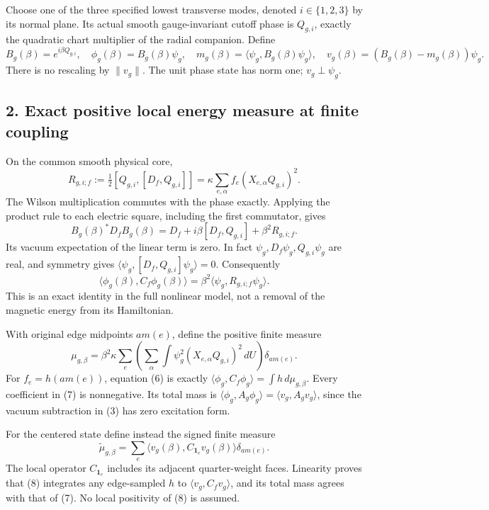 \documentclass[
  11pt,
]{article}
\begin{document}
Choose one of the three specified lowest transverse modes, denoted
\(i\in\{1,2,3\}\) by its normal plane. Its actual smooth gauge-invariant
cutoff phase is \(Q_{g,i}\), exactly the quadratic chart multiplier of
the radial companion. Define \[
 B_g(\beta)=e^{i\beta Q_{g,i}},\quad
 \phi_g(\beta)=B_g(\beta)\psi_g,\quad
 m_g(\beta)=\langle\psi_g,B_g(\beta)\psi_g\rangle,\quad
 v_g(\beta)=(B_g(\beta)-m_g(\beta))\psi_g .
 \tag{3}
\] There is no rescaling by \(\|v_g\|\). The unit phase state has norm
one; \(v_g\perp\psi_g\).

\subsection{2. Exact positive local energy measure at finite
coupling}\label{weak-coupling-part-12-exact-positive-local-energy-measure-at-finite-coupling}

On the common smooth physical core, \[
 R_{g,i;f}:=\tfrac12[Q_{g,i},[D_f,Q_{g,i}]]
           =\kappa\sum_{e,\alpha}f_e(X_{e,\alpha}Q_{g,i})^2 .
 \tag{4}
\] The Wilson multiplication commutes with the phase exactly. Applying
the product rule to each electric square, including the first
commutator, gives \[
 B_g(\beta)^*D_fB_g(\beta)
 =D_f+i\beta[D_f,Q_{g,i}]+\beta^2R_{g,i;f}.
 \tag{5}
\] Its vacuum expectation of the linear term is zero. In fact
\(\psi_g,D_f\psi_g,Q_{g,i}\psi_g\) are real, and symmetry gives
\(\langle\psi_g,[D_f,Q_{g,i}]\psi_g\rangle=0\). Consequently \[
 \boxed{\langle\phi_g(\beta),C_f\phi_g(\beta)\rangle
           =\beta^2\langle\psi_g,R_{g,i;f}\psi_g\rangle .}
 \tag{6}
\] This is an exact identity in the full nonlinear model, not a removal
of the magnetic energy from its Hamiltonian.

With original edge midpoints \(am(e)\), define the positive finite
measure \[
 \mu_{g,\beta}=\beta^2\kappa\sum_e
       \left(\sum_\alpha\int\psi_g^2
                     (X_{e,\alpha}Q_{g,i})^2\,dU\right)
                       \delta_{am(e)} .
 \tag{7}
\] For \(f_e=h(am(e))\), equation (6) is exactly
\(\langle\phi_g,C_f\phi_g\rangle=\int h\,d\mu_{g,\beta}\). Every
coefficient in (7) is nonnegative. Its total mass is
\(\langle\phi_g,A_g\phi_g\rangle
 =\langle v_g,A_gv_g\rangle\), since the vacuum subtraction in (3) has
zero excitation form.

For the centered state define instead the signed finite measure \[
 \widetilde\mu_{g,\beta}
     =\sum_e\langle v_g(\beta),C_{\mathbf1_e}v_g(\beta)\rangle
                                                  \delta_{am(e)} .
 \tag{8}
\] The local operator \(C_{\mathbf1_e}\) includes its adjacent
quarter-weight faces. Linearity proves that (8) integrates any
edge-sampled \(h\) to \(\langle v_g,C_fv_g\rangle\), and its total mass
agrees with that of (7). No local positivity of (8) is assumed.
\end{document}
